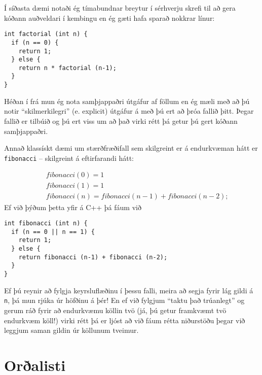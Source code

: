 Í síðasta dæmi notaði ég tímabundnar breytur í sérhverju skrefi til að gera kóðann auðveldari í kembingu en ég gæti hafa sparað nokkrar línur:

\begin{verbatim}
int factorial (int n) {
  if (n == 0) {
    return 1;
  } else {
    return n * factorial (n-1);
  }
}
\end{verbatim}
%
Héðan í frá mun ég nota samþjappaðri útgáfur af föllum en ég mæli með að þú notir ``skilmerkilegri'' (e. explicit) útgáfur á með þú ert að þróa fallið þitt.
Þegar fallið er tilbúið og þú ert viss um að það virki rétt þá getur þú gert kóðann samþjappaðri.

Annað klassískt dæmi um stærðfræðifall sem skilgreint er á endurkvæman hátt er {\tt fibonacci} -- skilgreint á eftirfarandi hátt:

\begin{eqnarray*}
&& fibonacci(0) = 1 \\
&& fibonacci(1) = 1 \\
&& fibonacci(n) = fibonacci(n-1) + fibonacci(n-2);
\end{eqnarray*}
%
Ef við þýðum þetta yfir á C++ þá fáum við

\begin{verbatim}
int fibonacci (int n) {
  if (n == 0 || n == 1) {
    return 1;
  } else {
    return fibonacci (n-1) + fibonacci (n-2);
  }
}
\end{verbatim}
%
Ef þú reynir að fylgja keyrsluflæðinu í þessu falli, meira að segja fyrir lág gildi á {\tt n}, þá mun rjúka úr höfðinu á þér!
En ef við fylgjum ``taktu það trúanlegt'' og gerum ráð fyrir að endurkvæmu köllin tvö
(já, þú getur framkvæmt tvö endurkvæm köll!) virki rétt þá er ljóst að við fáum rétta niðurstöðu þegar við leggjum saman gildin úr köllunum tveimur.

\section{Orðalisti}

